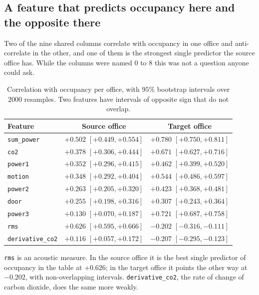 \subsection{A feature that predicts occupancy here and the opposite there}
\label{sec:occ-features}

Two of the nine shared columns correlate with occupancy in one office and anti-correlate
in the other, and one of them is the strongest single predictor the source office has.
While the columns were named $0$ to $8$ this was not a question anyone could ask.

\begin{table}[t]
\centering
\caption{Correlation with occupancy per office, with $95\%$ bootstrap intervals over
$2000$ resamples. Two features have intervals of opposite sign that do not overlap.}
\label{tab:occfeat}
\small
\begin{tabular}{@{}lcc@{}}
\toprule
Feature & Source office & Target office \\
\midrule
\texttt{sum\_power} & $+0.502$ $[+0.449,+0.554]$ & $+0.780$ $[+0.750,+0.811]$ \\
\texttt{co2}        & $+0.378$ $[+0.306,+0.444]$ & $+0.671$ $[+0.627,+0.716]$ \\
\texttt{power1}     & $+0.352$ $[+0.296,+0.415]$ & $+0.462$ $[+0.399,+0.520]$ \\
\texttt{motion}     & $+0.348$ $[+0.292,+0.404]$ & $+0.544$ $[+0.486,+0.597]$ \\
\texttt{power2}     & $+0.263$ $[+0.205,+0.320]$ & $+0.423$ $[+0.368,+0.481]$ \\
\texttt{door}       & $+0.255$ $[+0.198,+0.316]$ & $+0.307$ $[+0.243,+0.364]$ \\
\texttt{power3}     & $+0.130$ $[+0.070,+0.187]$ & $+0.721$ $[+0.687,+0.758]$ \\
\midrule
\texttt{rms}            & $\mathbf{+0.626}$ $[+0.595,+0.666]$ & $\mathbf{-0.202}$ $[-0.316,-0.111]$ \\
\texttt{derivative\_co2}& $+0.116$ $[+0.057,+0.172]$ & $-0.207$ $[-0.295,-0.123]$ \\
\bottomrule
\end{tabular}
\end{table}

\texttt{rms} is an acoustic measure. In the source office it is the best single predictor
of occupancy in the table at $+0.626$; in the target office it points the other way at
$-0.202$, with non-overlapping intervals. \texttt{derivative\_co2}, the rate of change of
carbon dioxide, does the same more weakly.

